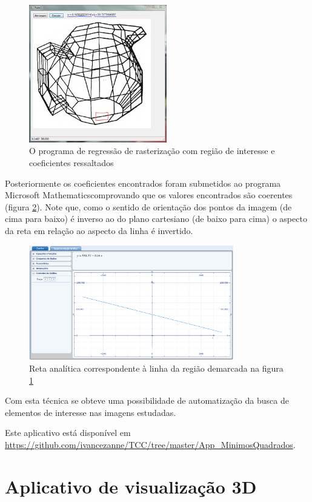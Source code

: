 	\begin{figure}[!htb]
		\centering
		\includegraphics[height=6cm]{imagens/programaComBule.png}
		\caption{O programa de regressão de rasterização com região de interesse e coeficientes ressaltados}
		\label{figMinQuadInterface}
	\end{figure}

	Posteriormente os coeficientes encontrados foram submetidos ao programa Microsoft Mathematics\textregistered  comprovando que os valores encontrados são coerentes (figura \ref{mathematics}). Note que, como o sentido de orientação dos pontos da imagem (de cima para baixo) é inverso ao do plano cartesiano (de baixo para cima) o aspecto da reta em relação ao aspecto da linha é invertido.
	
	\begin{figure}[!htb]
		\centering
		\includegraphics[height=5cm]{imagens/mathematics1.png}
		\caption{Reta analítica correspondente à linha da região demarcada na figura \ref{figMinQuadInterface}}
		\label{mathematics}
	\end{figure}
	
	Com esta técnica se obteve uma possibilidade de automatização da busca de elementos de interesse nas imagens estudadas.
	
	Este aplicativo está disponível em \url{https://github.com/ivancezanne/TCC/tree/master/App_MinimosQuadrados}.
	
	\section{Aplicativo de visualização 3D}
		\label{app3D}
		
